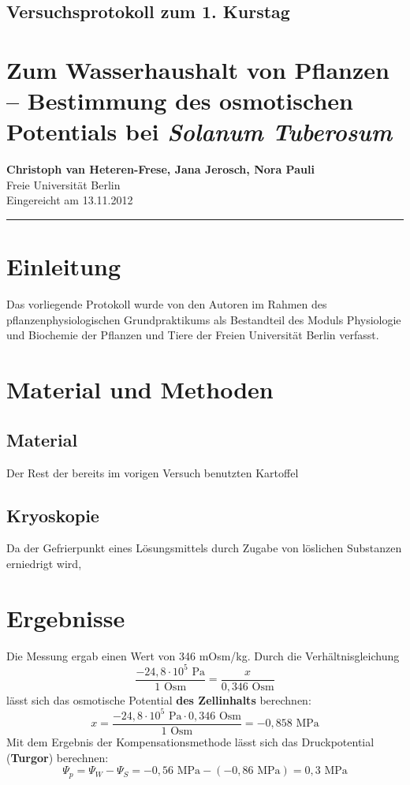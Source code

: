 \documentclass[11pt,a4paper,DIV=10,]{scrartcl}
\begin{document}
\onecolumn
\subsection*{Versuchsprotokoll zum 1. Kurstag }
\section*{Zum Wasserhaushalt von Pflanzen -- Bestimmung des osmotischen Potentials bei \textit{Solanum Tuberosum}}
\textbf{Christoph van Heteren-Frese\footnotemark[1], Jana Jerosch\footnotemark[1], Nora Pauli\footnotemark[1]} \\[0.1cm]
\footnotemark[1]Freie Universität Berlin\\[0.2cm]
Eingereicht am 13.11.2012\\
\hrule
%
\section*{Einleitung}    
Das vorliegende Protokoll wurde von den Autoren im Rahmen des pflanzenphysiologischen Grundpraktikums als Bestandteil des Moduls Physiologie und Biochemie der Pflanzen und Tiere der Freien Universität Berlin verfasst. 


\section*{Material und Methoden}
\subsection*{Material}
Der Rest der bereits im vorigen Versuch benutzten Kartoffel
\subsection*{Kryoskopie}
Da der Gefrierpunkt eines Lösungsmittels durch Zugabe von löslichen Substanzen erniedrigt wird, 
\citep[vgl.][S. 261]{strasburger_lehrbuch_2012}
%

\section*{Ergebnisse}
Die Messung ergab einen Wert von 346 mOsm/kg. Durch die Verhältnisgleichung
\begin{equation}
\dfrac{-24,8 \cdot 10^5 \textrm{~Pa}}{1 \textrm{~Osm} } = \dfrac{x}{0,346 \textrm{~Osm}}
\end{equation}
lässt sich das osmotische Potential \textbf{des Zellinhalts} berechnen:
\begin{equation}
x = \dfrac{-24,8 \cdot 10^5 \textrm{~Pa} \cdot 0,346 \textrm{~Osm}}{1 \textrm{~Osm} } = -0,858 \textrm{~MPa}
\end{equation}
Mit dem Ergebnis der Kompensationsmethode lässt sich das Druckpotential (\textbf{Turgor}) berechnen:
\begin{equation}
\Psi_p=\Psi_W-\Psi_S=-0,56 \textrm{~MPa} - (-0,86 \textrm{~MPa})= 0,3 \textrm{~MPa}
\end{equation}
\end{document}

